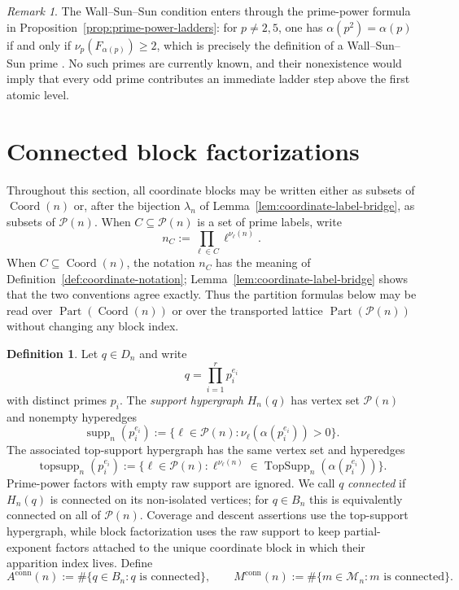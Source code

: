 \documentclass[11pt,letterpaper]{article}
\numberwithin{equation}{section}
\theoremstyle{plain}
\theoremstyle{definition}
\newtheorem{definition}[theorem]{Definition}
\theoremstyle{remark}
\newtheorem{remark}[theorem]{Remark}
\DeclareMathOperator{\Part}{Part}
\DeclareMathOperator{\Coord}{Coord}
\DeclareMathOperator{\TopSupp}{TopSupp}
\begin{document}
\begin{remark}\label{rem:wss}
The Wall--Sun--Sun condition enters through
the prime-power formula in Proposition~\ref{prop:prime-power-ladders}: for
$p\neq 2,5$, one has
$\alpha(p^2)=\alpha(p)$ if and only if $\nu_p(F_{\alpha(p)})\ge 2$, which is
precisely the definition of a Wall--Sun--Sun prime
\cite{SunSun1992FibonacciFLT}. No such primes are currently known, and their
nonexistence would imply that every odd prime contributes an immediate ladder
step above the first atomic level.
\end{remark}

\section{Connected block factorizations}\label{sec:connected}

Throughout this section, all coordinate blocks may be written either as subsets
of \(\Coord(n)\) or, after the bijection
\(\lambda_n\) of Lemma~\ref{lem:coordinate-label-bridge}, as subsets of
\(\mathcal P(n)\).  When \(C\subseteq\mathcal P(n)\) is a set of prime labels,
write
\[
n_C:=\prod_{\ell\in C}\ell^{\nu_\ell(n)}.
\]
When \(C\subseteq\Coord(n)\), the notation \(n_C\) has the meaning of
Definition~\ref{def:coordinate-notation}; Lemma~\ref{lem:coordinate-label-bridge}
shows that the two conventions agree exactly.  Thus the partition formulas
below may be read over \(\Part(\Coord(n))\) or over the transported lattice
\(\Part(\mathcal P(n))\) without changing any block index.

\begin{definition}\label{def:support-hypergraph}
Let $q\in D_n$ and write
\[
q=\prod_{i=1}^r p_i^{e_i}
\]
with distinct primes $p_i$. The \emph{support hypergraph} $H_n(q)$ has vertex
set $\mathcal P(n)$ and nonempty hyperedges
\[
\operatorname{supp}_n(p_i^{e_i})
:=\{\ell\in\mathcal P(n):\nu_\ell(\alpha(p_i^{e_i}))>0\}.
\]
The associated top-support hypergraph has the same vertex set and hyperedges
\[
\operatorname{topsupp}_n(p_i^{e_i})
:=\{\ell\in\mathcal P(n):
\ell^{\nu_\ell(n)}\in\TopSupp_n(\alpha(p_i^{e_i}))\}.
\]
Prime-power factors with empty raw support are ignored. We call $q$
\emph{connected} if $H_n(q)$ is connected on its non-isolated vertices; for
$q\in B_n$ this is equivalently connected on all of \(\mathcal P(n)\). Coverage
and descent assertions use the top-support hypergraph, while block
factorization uses the raw support to keep partial-exponent factors attached to
the unique coordinate block in which their apparition index lives.
Define
\[
A^{\mathrm{conn}}(n):=\#\{q\in B_n:q\text{ is connected}\},
\qquad
M^{\mathrm{conn}}(n):=\#\{m\in\mathcal M_n:m\text{ is connected}\}.
\]
\end{definition}
\end{document}
